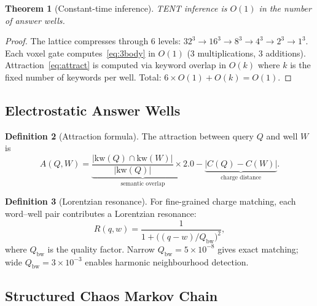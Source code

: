 \documentclass[12pt,a4paper]{article}
\theoremstyle{plain}
\newtheorem{theorem}{Theorem}[section]
\theoremstyle{definition}
\newtheorem{definition}[theorem]{Definition}
\theoremstyle{remark}
\begin{document}
\begin{theorem}[Constant-time inference]
\label{thm:o1}
TENT inference is $O(1)$ in the number of answer wells.
\end{theorem}

\begin{proof}
The lattice compresses through 6 levels:
$32^3 \to 16^3 \to 8^3 \to 4^3 \to 2^3 \to 1^3$.
Each voxel gate computes~\eqref{eq:3body} in $O(1)$
(3 multiplications, 3 additions).
Attraction~\eqref{eq:attract} is computed via keyword overlap in
$O(k)$ where $k$ is the fixed number of keywords per well.
Total: $6 \times O(1) + O(k) = O(1)$.
\end{proof}

\subsection{Electrostatic Answer Wells}

\begin{definition}[Attraction formula]
\label{def:attract}
The attraction between query $Q$ and well $W$ is
\begin{equation}
A(Q,W)
= \underbrace{\frac{|\text{kw}(Q) \cap \text{kw}(W)|}{|\text{kw}(Q)|}
  \times 2.0}_{\text{semantic overlap}}
- \underbrace{|C(Q) - C(W)|}_{\text{charge distance}}.
\label{eq:attract}
\end{equation}
\end{definition}

\begin{definition}[Lorentzian resonance]
For fine-grained charge matching, each word--well pair contributes a
Lorentzian resonance:
\begin{equation}
R(q,w) = \frac{1}{1 + \bigl((q-w)/Q_{\text{bw}}\bigr)^2},
\label{eq:lorentz}
\end{equation}
where $Q_{\text{bw}}$ is the quality factor.
Narrow $Q_{\text{bw}} = 5\times10^{-8}$ gives exact matching;
wide $Q_{\text{bw}} = 3\times10^{-3}$ enables harmonic neighbourhood
detection.
\end{definition}

\subsection{Structured Chaos Markov Chain}
\end{document}
